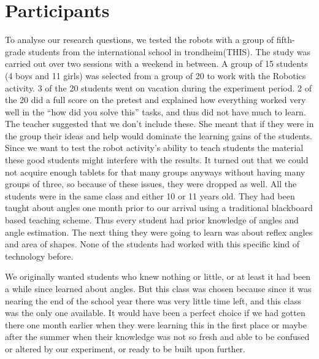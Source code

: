 \chapter{Participants}
To analyse our research questions, we tested the robots with a group of fifth-grade students from the international school in trondheim(THIS). The study was carried out over two sessions with a weekend in between. A group of 15 students (4 boys and 11 girls) was selected from a group of 20 to work with the Robotics activity. 3 of the 20 students went on vacation during the experiment period. 2 of the 20 did a full score on the pretest and explained how everything worked very well in the “how did you solve this” tasks, and thus did not have much to learn. The teacher suggested that we don’t include these. She meant that if they were in the group their ideas and help would dominate the learning gains of the students. Since we want to test the robot activity’s ability to teach students the material these good students might interfere with the results. It turned out that we could not acquire enough tablets for that many groups anyways without having many groups of three, so because of these issues, they were dropped as well. All the students were in the same class and either 10 or 11 years old. They had been taught about angles one month prior to our arrival using a traditional blackboard based teaching scheme. Thus every student had prior knowledge of angles and angle estimation. The next thing they were going to learn was about reflex angles and area of shapes. None of the students had worked with this specific kind of technology before.  

\bigskip\noindent
We originally wanted students who knew nothing or little, or at least it had been a while since learned about angles. But this class was chosen because since it was nearing the end of the school year there was very little time left, and this class was the only one available. It would have been a perfect choice if we had gotten there one month earlier when they were learning this in the first place or maybe after the summer when their knowledge was not so fresh and able to be confused or altered by our experiment, or ready to be built upon further. 